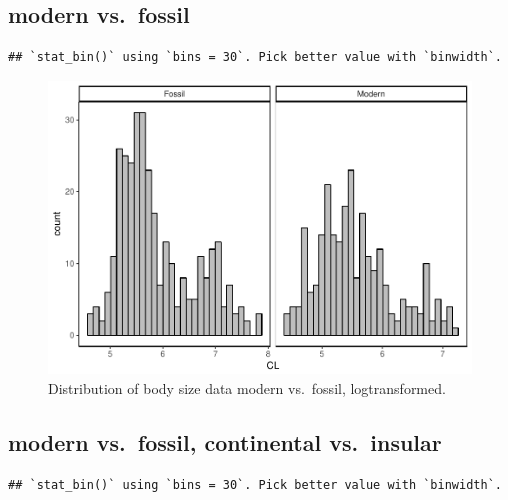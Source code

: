 \documentclass[]{article}
\begin{document}
\newpage

\subsection{modern vs.~fossil}\label{modern-vs.fossil}

\begin{verbatim}
## `stat_bin()` using `bins = 30`. Pick better value with `binwidth`.
\end{verbatim}

\begin{figure}[htbp]
\centering
\includegraphics{MA_JJ_files/figure-latex/Histograms of body size data, modern vs. fossil-1.pdf}
\caption{Distribution of body size data modern vs.~fossil,
logtransformed.}
\end{figure}

\newpage

\subsection{modern vs.~fossil, continental
vs.~insular}\label{modern-vs.fossil-continental-vs.insular}

\begin{verbatim}
## `stat_bin()` using `bins = 30`. Pick better value with `binwidth`.
\end{verbatim}
\end{document}
